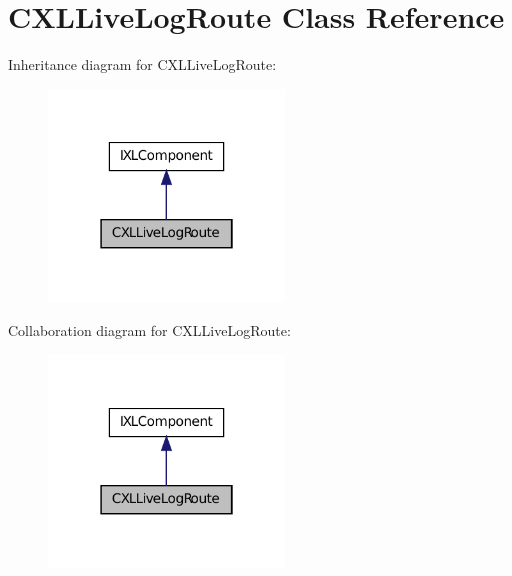 \hypertarget{classCXLLiveLogRoute}{
\section{CXLLiveLogRoute Class Reference}
\label{classCXLLiveLogRoute}
}


Inheritance diagram for CXLLiveLogRoute:\nopagebreak
\begin{figure}[H]
\begin{center}
\leavevmode
\includegraphics[width=178pt]{classCXLLiveLogRoute__inherit__graph}
\end{center}
\end{figure}


Collaboration diagram for CXLLiveLogRoute:\nopagebreak
\begin{figure}[H]
\begin{center}
\leavevmode
\includegraphics[width=178pt]{classCXLLiveLogRoute__coll__graph}
\end{center}
\end{figure}
